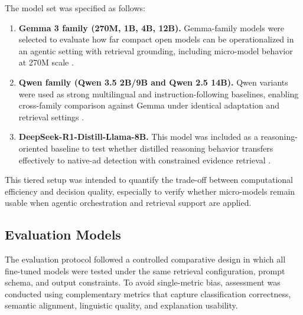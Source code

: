 \documentclass{ieeeaccess}
\begin{document}
The model set was specified as follows:
\begin{enumerate}
    \item \textbf{Gemma 3 family (270M, 1B, 4B, 12B).} Gemma-family models were selected to evaluate how far compact open models can be operationalized in an agentic setting with retrieval grounding, including micro-model behavior at 270M scale \cite{r16}.
    \item \textbf{Qwen family (Qwen 3.5 2B/9B and Qwen 2.5 14B).} Qwen variants were used as strong multilingual and instruction-following baselines, enabling cross-family comparison against Gemma under identical adaptation and retrieval settings \cite{r32}.
    \item \textbf{DeepSeek-R1-Distill-Llama-8B.} This model was included as a reasoning-oriented baseline to test whether distilled reasoning behavior transfers effectively to native-ad detection with constrained evidence retrieval \cite{r33}.
\end{enumerate}

This tiered setup was intended to quantify the trade-off between computational efficiency and decision quality, especially to verify whether micro-models remain usable when agentic orchestration and retrieval support are applied.

\subsection{Evaluation Models}
The evaluation protocol followed a controlled comparative design in which all fine-tuned models were tested under the same retrieval configuration, prompt schema, and output constraints. To avoid single-metric bias, assessment was conducted using complementary metrics that capture classification correctness, semantic alignment, linguistic quality, and explanation usability.
\end{document}
